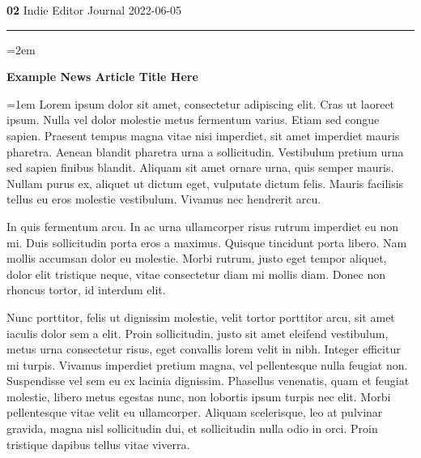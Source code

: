 \documentclass[a4paper,11pt]{article}
\begin{document}
{{\huge\ttfamily\bfseries 02}
	\hfill
	Indie Editor Journal
	\hfill
	2022-06-05}
\rule{\linewidth}{1pt}\par
\begin{tcolorbox}[arc=0pt,colback=white,colframe=white,boxsep=0pt,boxrule=0pt,width=\textwidth,height=\textheight-5em,top=0pt,bottom=0pt,left=0pt,right=0pt]
    \columnsep=2em
    \columnseprule=0.4pt
	\begin{multicols}{3}
		\hspace{1pt}\vskip 1pt\vfill\par
		\begin{minipage}{\linewidth}
			\LARGE\bfseries\center
			Example News Article Title Here
		\end{minipage}\par
		\vskip 15pt\vfill
		\parindent=1em
		Lorem ipsum dolor sit amet, consectetur adipiscing elit. Cras ut laoreet ipsum. Nulla vel dolor molestie metus fermentum varius. Etiam sed congue sapien. Praesent tempus magna vitae nisi imperdiet, sit amet imperdiet mauris pharetra. Aenean blandit pharetra urna a sollicitudin. Vestibulum pretium urna sed sapien finibus blandit. Aliquam sit amet ornare urna, quis semper mauris. Nullam purus ex, aliquet ut dictum eget, vulputate dictum felis. Mauris facilisis tellus eu eros molestie vestibulum. Vivamus nec hendrerit arcu.\par
		In quis fermentum arcu. In ac urna ullamcorper risus rutrum imperdiet eu non mi. Duis sollicitudin porta eros a maximus. Quisque tincidunt porta libero. Nam mollis accumsan dolor eu molestie. Morbi rutrum, justo eget tempor aliquet, dolor elit tristique neque, vitae consectetur diam mi mollis diam. Donec non rhoncus tortor, id interdum elit.\par
		Nunc porttitor, felis ut dignissim molestie, velit tortor porttitor arcu, sit amet iaculis dolor sem a elit. Proin sollicitudin, justo sit amet eleifend vestibulum, metus urna consectetur risus, eget convallis lorem velit in nibh. Integer efficitur mi turpis. Vivamus imperdiet pretium magna, vel pellentesque nulla feugiat non. Suspendisse vel sem eu ex lacinia dignissim. Phasellus venenatis, quam et feugiat molestie, libero metus egestas nunc, non lobortis ipsum turpis nec elit. Morbi pellentesque vitae velit eu ullamcorper. Aliquam scelerisque, leo at pulvinar gravida, magna nisl sollicitudin dui, et sollicitudin nulla odio in orci. Proin tristique dapibus tellus vitae viverra.\par

\end{multicols}
\end{tcolorbox}
\end{document}
